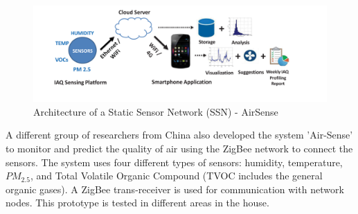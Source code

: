 \begin{figure}[h!]
  \begin{center}
  \includegraphics[scale=0.80]{./images/figure42.png}
  \end{center}
 
  \caption{Architecture of a Static Sensor Network (SSN) - AirSense \cite{Fang2016} }
  
  \label{CSN}
\end{figure}



A different group of researchers from China also developed the system 'Air-Sense' \cite{Liu2017} to monitor and predict the quality of air using the ZigBee network to connect the sensors. The system uses four different types of sensors: humidity, temperature, $PM_{2.5}$, and Total Volatile Organic Compound (TVOC includes the general organic gases). A ZigBee trans-receiver is used for communication with network nodes. This prototype is tested in different areas in the house.
\par

